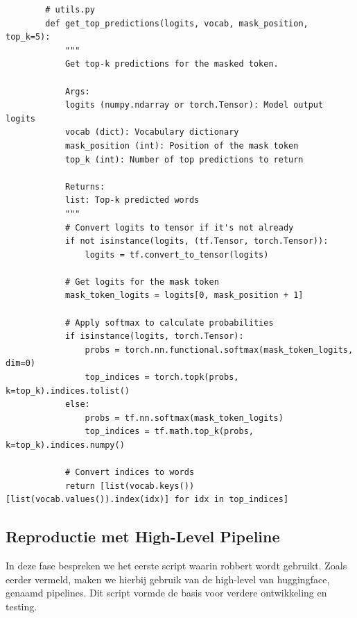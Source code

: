 \begin{listing}
    \begin{verbatim}
        # utils.py
        def get_top_predictions(logits, vocab, mask_position, top_k=5):
            """
            Get top-k predictions for the masked token.
            
            Args:
            logits (numpy.ndarray or torch.Tensor): Model output logits
            vocab (dict): Vocabulary dictionary
            mask_position (int): Position of the mask token
            top_k (int): Number of top predictions to return
            
            Returns:
            list: Top-k predicted words
            """
            # Convert logits to tensor if it's not already
            if not isinstance(logits, (tf.Tensor, torch.Tensor)):
                logits = tf.convert_to_tensor(logits)
            
            # Get logits for the mask token
            mask_token_logits = logits[0, mask_position + 1]
            
            # Apply softmax to calculate probabilities
            if isinstance(logits, torch.Tensor):
                probs = torch.nn.functional.softmax(mask_token_logits, dim=0)
                top_indices = torch.topk(probs, k=top_k).indices.tolist()
            else:
                probs = tf.nn.softmax(mask_token_logits)
                top_indices = tf.math.top_k(probs, k=top_k).indices.numpy()
            
            # Convert indices to words
            return [list(vocab.keys())[list(vocab.values()).index(idx)] for idx in top_indices]
    \end{verbatim}
    \caption[\texttt{get\_top\_predictions}]{\texttt{get\_top\_predictions}: Deze functie zet de logit-uitvoer van het model om in \glspl{tensor} en past vervolgens \gls{softmax} toe om de waarschijnlijkheden van voorspellingen te berekenen. Het retourneert de top \(k\) voorspellingen op basis van de maskeringstoken en het vocabulaire.}
    \label{lst:gettopk}
\end{listing}

\subsection{Reproductie met High-Level Pipeline}

In deze fase bespreken we het eerste script waarin \gls{robbert} wordt gebruikt. Zoals eerder vermeld, maken we hierbij gebruik van de high-level  van \gls{huggingface}, genaamd pipelines. Dit script vormde de basis voor verdere ontwikkeling en testing.

